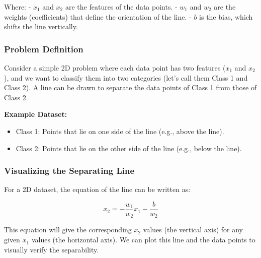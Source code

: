 \documentclass[11pt]{article}
\providecommand{\tightlist}{%
      \setlength{\itemsep}{0pt}\setlength{\parskip}{0pt}}
\begin{document}
Where: - $x_1$ and $x_2$ are the features of the data points. -
$w_1$ and $w_2$ are the weights (coefficients) that define the
orientation of the line. - $b$ is the bias, which shifts the line
vertically.

\subsubsection{Problem Definition}\label{problem-definition}

Consider a simple 2D problem where each data point has two features
($x_1$ and $x_2$), and we want to classify them into two categories
(let's call them Class 1 and Class 2). A line can be drawn to separate
the data points of Class 1 from those of Class 2.

\textbf{Example Dataset:}

\begin{itemize}
\tightlist
\item
  Class 1: Points that lie on one side of the line (e.g., above the
  line).
\item
  Class 2: Points that lie on the other side of the line (e.g., below
  the line).
\end{itemize}

\subsubsection{Visualizing the Separating
Line}\label{visualizing-the-separating-line}

For a 2D dataset, the equation of the line can be written as:

$$
x_2 = -\frac{w_1}{w_2} x_1 - \frac{b}{w_2}
$$

This equation will give the corresponding $x_2$ values (the vertical
axis) for any given $x_1$ values (the horizontal axis). We can plot
this line and the data points to visually verify the separability.
\end{document}
